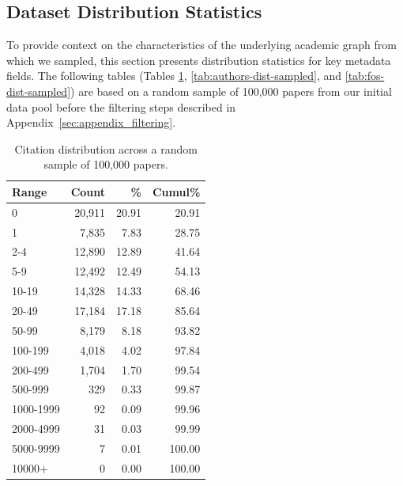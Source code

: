 \documentclass[11pt]{article}
\begin{document}
\begin{center}
\begin{tikzpicture}[node distance=0.8cm]
\end{tikzpicture}
{\captionsetup{hypcap=false}%
\label{fig:data_filtering}}

\end{center}

\subsection{Dataset Distribution Statistics}
\label{sec:appendix_stats}

To provide context on the characteristics of the underlying academic graph from which we sampled, this section presents distribution statistics for key metadata fields. The following tables (Tables \ref{tab:citations-dist-sampled}, \ref{tab:authors-dist-sampled}, and \ref{tab:fos-dist-sampled}) are based on a random sample of 100,000 papers from our initial data pool before the filtering steps described in Appendix~\ref{sec:appendix_filtering}.

\begin{table}[htbp]
\centering

\begin{tabular}{lrrr}
\toprule
\textbf{Range} & \textbf{Count} & \% & \textbf{Cumul}\% \\
\midrule
0 & 20,911 & 20.91 & 20.91 \\
1 & 7,835 & 7.83 & 28.75 \\
2-4 & 12,890 & 12.89 & 41.64 \\
5-9 & 12,492 & 12.49 & 54.13 \\
10-19 & 14,328 & 14.33 & 68.46 \\
20-49 & 17,184 & 17.18 & 85.64 \\
50-99 & 8,179 & 8.18 & 93.82 \\
100-199 & 4,018 & 4.02 & 97.84 \\
200-499 & 1,704 & 1.70 & 99.54 \\
500-999 & 329 & 0.33 & 99.87 \\
1000-1999 & 92 & 0.09 & 99.96 \\
2000-4999 & 31 & 0.03 & 99.99 \\
5000-9999 & 7 & 0.01 & 100.00 \\
10000+ & 0 & 0.00 & 100.00 \\
\bottomrule
\end{tabular}
\caption{Citation distribution across a random sample of 100,000 papers.}
\label{tab:citations-dist-sampled}
\end{table}
\end{document}
